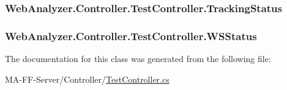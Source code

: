 \subsubsection[{Tracking\+Status}]{ Web\+Analyzer.\+Controller.\+Test\+Controller.\+Tracking\+Status\hspace{0.3cm}{\ttfamily [get]}}\label{class_web_analyzer_1_1_controller_1_1_test_controller_adc0db19e3cc5958f24dd5fd09ce34d98}
\hypertarget{class_web_analyzer_1_1_controller_1_1_test_controller_a1f3032c3be238b03976be19319a64eeb}{}
\subsubsection[{W\+S\+Status}]{ Web\+Analyzer.\+Controller.\+Test\+Controller.\+W\+S\+Status\hspace{0.3cm}{\ttfamily [get]}}\label{class_web_analyzer_1_1_controller_1_1_test_controller_a1f3032c3be238b03976be19319a64eeb}


The documentation for this class was generated from the following file\+:\begin{DoxyCompactItemize}
\item 
M\+A-\/\+F\+F-\/\+Server/\+Controller/\hyperlink{_test_controller_8cs}{Test\+Controller.\+cs}\end{DoxyCompactItemize}
